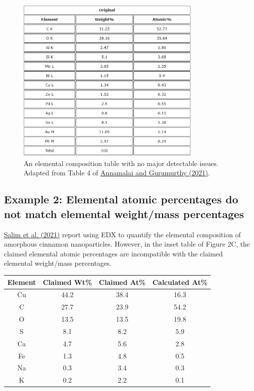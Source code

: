 \documentclass[letterpaper, 12pt]{article}
\begin{document}
\begin{figure}[h!tbp]
    \centering
    \includegraphics[width=0.8\textwidth]{img/elemental_composition/annamalai_gurumurthy_table_4.png}
    \caption*{An elemental composition table with no major detectable issues. Adapted from Table 4 of \href{https://doi.org/10.1080/10962247.2020.1813836}{Annamalai and Gurumurthy (2021)}.}
\end{figure}

\pagebreak

\subsection*{Example 2: Elemental atomic percentages do not match elemental weight/mass percentages}

\href{https://doi.org/10.1016/j.photonics.2020.100889}{Salim et al. (2021)} report using EDX to quantify the elemental composition of amorphous cinnamon nanoparticles. However, in the inset table of Figure 2C, the claimed elemental atomic percentages are incompatible with the claimed elemental weight/mass percentages.

\begin{table}[h!tbp]
\begin{center}
\begin{tabular}{c|c|c|c}
Element & Claimed Wt\% 	& Claimed At\% 	& Calculated At\%\\
\hline
Cu 	& 44.2 	& 38.4 	& 16.3\\
C 	& 27.7 	& 23.9 	& 54.2\\
O 	& 13.5 	& 13.5 	& 19.8\\
S 	& 8.1 	& 8.2 	& 5.9\\
Ca 	& 4.7 	& 5.6 	& 2.8\\
Fe 	& 1.3 	& 4.8 	& 0.5\\
Na 	& 0.3 	& 3.4 	& 0.3\\
K 	& 0.2 	& 2.2 	& 0.1\\
\end{tabular}
\end{center}
\end{table}
\end{document}
